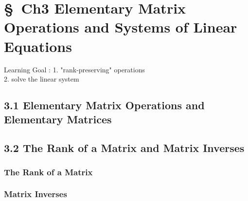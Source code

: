 


\chapter{\S\  Ch3 Elementary Matrix Operations and Systems of Linear Equations}

Learning Goal : 
1. "rank-preserving" operations \\
2. solve the linear system 

\section{3.1 Elementary Matrix Operations and Elementary Matrices }
	





\section{3.2 The Rank of a Matrix and Matrix Inverses } 
\subsection{The Rank of a Matrix}










\subsection{Matrix Inverses}




